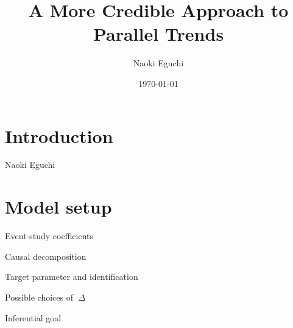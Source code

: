 \documentclass[xcolor=svgnames,aspectratio=169]{beamer}
\begin{document}
 

\title{A More Credible Approach to Parallel Trends}
\author{Naoki Eguchi}          
\date{\today}

\begin{frame}                  
    \titlepage                     
\end{frame}

\section{Introduction}

\begin{frame}{}
    \begin{definition}[name]
        Naoki Eguchi
    \end{definition}
\end{frame}

\section{Model setup}

\begin{frame}{Event-study coefficients}
    \begin{itemize}
    \end{itemize}
\end{frame}

\begin{frame}{Causal decomposition}
    \begin{itemize}
    \end{itemize}
\end{frame}

\begin{frame}{Target parameter and identification}
    \begin{itemize}
    \end{itemize}
\end{frame}

\begin{frame}{Possible choices of ${\Delta}$}
    \begin{itemize}
    \end{itemize}
\end{frame}

\begin{frame}{Inferential goal}
    \begin{itemize}
    \end{itemize}
\end{frame}
\end{document}
